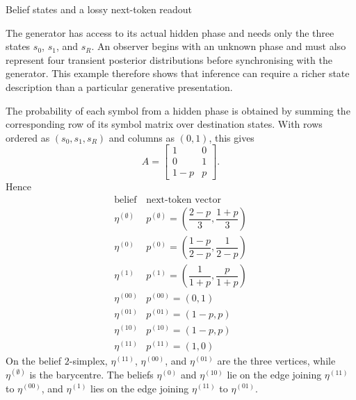\begin{exercise}[Core]{Belief states and a lossy next-token readout}
\begin{solution}
\begin{parts}
\begin{subparts}
          \item The generator has access to its actual hidden phase and needs
            only the three states $s_0$, $s_1$, and $s_R$. An observer begins with
            an unknown phase and must also represent four transient posterior
            distributions before synchronising with the generator. This
            example therefore shows that inference can require a richer state
            description than a particular generative presentation.
        \end{subparts}

      \item The probability of each symbol from a hidden phase is obtained by
        summing the corresponding row of its symbol matrix over destination
        states. With rows ordered as $(s_0,s_1,s_R)$ and columns as $(0,1)$, this gives
        \[
          A=
          \begin{bmatrix}
            1&0\\
            0&1\\
            1-p&p
          \end{bmatrix}.
        \]
        Hence
        \[
          \begin{array}{c|c}
            \text{belief} & \text{next-token vector}\\
            \hline
            \eta^{(\emptyset)} &
              p^{(\emptyset)}=
              \left(\dfrac{2-p}{3},\dfrac{1+p}{3}\right)\\[1mm]
            \eta^{(0)} &
              p^{(0)}=
              \left(\dfrac{1-p}{2-p},\dfrac{1}{2-p}\right)\\[1mm]
            \eta^{(1)} &
              p^{(1)}=
              \left(\dfrac{1}{1+p},\dfrac{p}{1+p}\right)\\[1mm]
            \eta^{(00)} & p^{(00)}=(0,1)\\
            \eta^{(01)} & p^{(01)}=(1-p,p)\\
            \eta^{(10)} & p^{(10)}=(1-p,p)\\
            \eta^{(11)} & p^{(11)}=(1,0)
          \end{array}
        \]
        On the belief $2$-simplex, $\eta^{(11)}$, $\eta^{(00)}$, and
        $\eta^{(01)}$ are the three vertices, while
        $\eta^{(\emptyset)}$ is the barycentre. The beliefs $\eta^{(0)}$ and
        $\eta^{(10)}$ lie on the edge joining $\eta^{(11)}$ to
        $\eta^{(00)}$, and $\eta^{(1)}$ lies on the edge joining
        $\eta^{(11)}$ to $\eta^{(01)}$.


\end{parts}
\end{solution}
\end{exercise}
